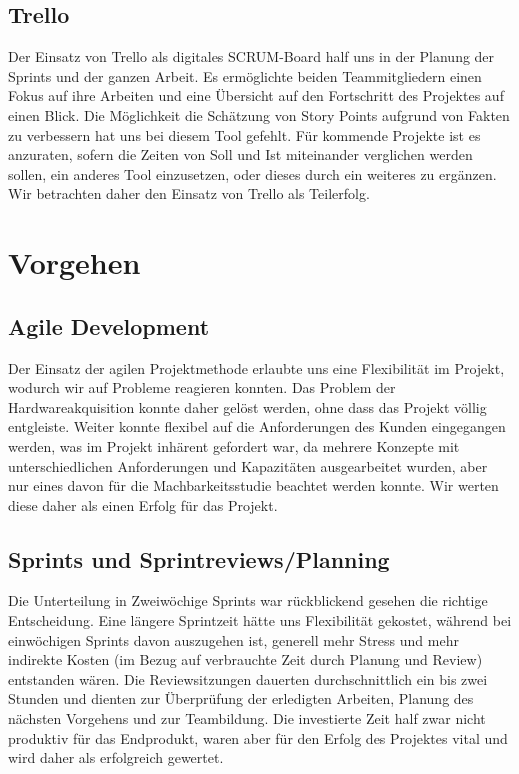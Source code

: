 \subsection{Trello}
Der Einsatz von Trello als digitales SCRUM-Board half uns in der Planung der Sprints und der ganzen Arbeit. Es ermöglichte beiden Teammitgliedern einen Fokus auf ihre Arbeiten und eine Übersicht auf den Fortschritt des Projektes auf einen Blick. Die Möglichkeit die Schätzung von Story Points aufgrund von Fakten zu verbessern hat uns bei diesem Tool gefehlt. Für kommende Projekte ist es anzuraten, sofern die Zeiten von Soll und Ist miteinander verglichen werden sollen, ein anderes Tool einzusetzen, oder dieses durch ein weiteres zu ergänzen. Wir betrachten daher den Einsatz von Trello als Teilerfolg.

\section{Vorgehen}
\subsection{Agile Development}
Der Einsatz der agilen Projektmethode erlaubte uns eine Flexibilität im Projekt, wodurch wir auf Probleme reagieren konnten. Das Problem der Hardwareakquisition konnte daher gelöst werden, ohne dass das Projekt völlig entgleiste. Weiter konnte flexibel auf die Anforderungen des Kunden eingegangen werden, was im Projekt inhärent gefordert war, da mehrere Konzepte mit unterschiedlichen Anforderungen und Kapazitäten ausgearbeitet wurden, aber nur eines davon für die Machbarkeitsstudie beachtet werden konnte. Wir werten diese daher als einen Erfolg für das Projekt.

\subsection{Sprints und Sprintreviews/Planning}
Die Unterteilung in Zweiwöchige Sprints war rückblickend gesehen die richtige Entscheidung. Eine längere Sprintzeit hätte uns Flexibilität gekostet, während bei einwöchigen Sprints davon auszugehen ist, generell mehr Stress und mehr indirekte Kosten (im Bezug auf verbrauchte Zeit durch Planung und Review) entstanden wären. Die Reviewsitzungen dauerten durchschnittlich ein bis zwei Stunden und dienten zur Überprüfung der erledigten Arbeiten, Planung des nächsten Vorgehens und zur Teambildung. Die investierte Zeit half zwar nicht produktiv für das Endprodukt, waren aber für den Erfolg des Projektes vital und wird daher als erfolgreich gewertet.

